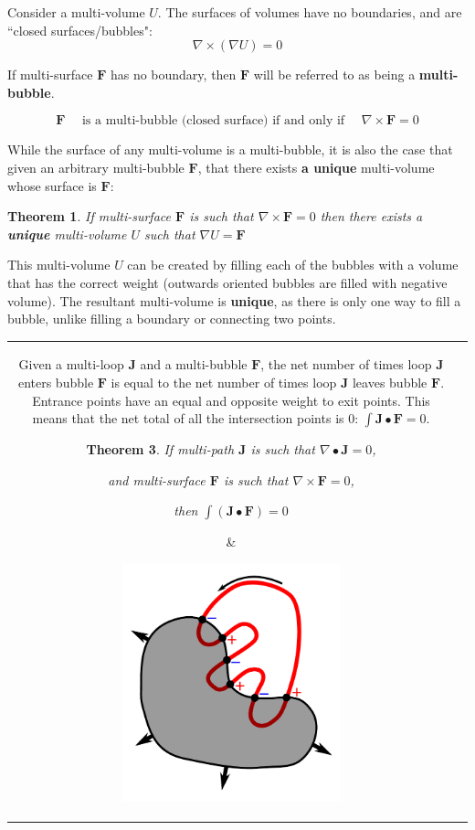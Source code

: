 \documentclass{book}
\newtheorem{thm}{Theorem}
\begin{document}
Consider a multi-volume \(U\). The surfaces of volumes have no boundaries, and are ``closed surfaces/bubbles":
\[\nabla \times (\nabla U) = 0\]    

If multi-surface \(\mathbf{F}\) has no boundary, then \(\mathbf{F}\) will be referred to as being a {\bf multi-bubble}.

\[\mathbf{F} \quad\text{ is a multi-bubble (closed surface) if and only if }\quad \nabla \times \mathbf{F} = 0\]

While the surface of any multi-volume is a multi-bubble, it is also the case that given an arbitrary multi-bubble \(\mathbf{F}\), that there exists {\bf a unique} multi-volume whose surface is \(\mathbf{F}\):

\begin{thm}
If multi-surface \(\mathbf{F}\) is such that \(\nabla \times \mathbf{F} = 0\)
then there exists a {\bf unique} multi-volume \(U\) such that \(\nabla U = \mathbf{F}\)
\end{thm}

This multi-volume \(U\) can be created by filling each of the bubbles with a volume that has the correct weight (outwards oriented bubbles are filled with negative volume). The resultant multi-volume is {\bf unique}, as there is only one way to fill a bubble, unlike filling a boundary or connecting two points.



\begin{tabular}{cc}
\parbox{0.5\textwidth}{
Given a multi-loop \(\mathbf{J}\) and a multi-bubble \(\mathbf{F}\), the net number of times loop \(\mathbf{J}\) enters bubble \(\mathbf{F}\) is equal to the net number of times loop \(\mathbf{J}\) leaves bubble \(\mathbf{F}\). Entrance points have an equal and opposite weight to exit points. This means that the net total of all the intersection points is \(0\): \(\int \mathbf{J} \bullet \mathbf{F} = 0\). 

\begin{thm}
If multi-path \(\mathbf{J}\) is such that \(\nabla \bullet \mathbf{J} = 0\), 

and multi-surface \(\mathbf{F}\) is such that \(\nabla \times \mathbf{F} = 0\), 

then \(\int (\mathbf{J} \bullet \mathbf{F}) = 0\)
\end{thm}
} & \parbox{0.5\textwidth}{
\includegraphics[width = 0.5\textwidth]{Intersections/Path-surface_intersections/closed_surface_and_closed_path}
}
\end{tabular}
\end{document}
